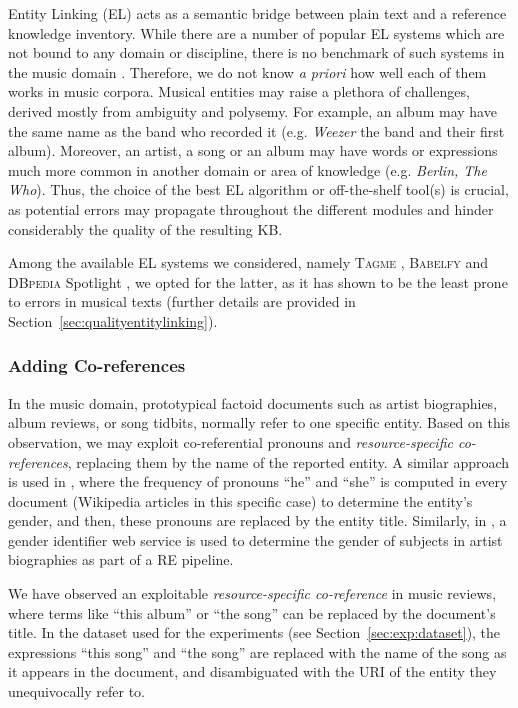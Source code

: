 Entity Linking (\textsc{EL}) acts as a semantic bridge between plain text and a reference knowledge inventory. While there are a number of popular \textsc{EL} systems which are not bound to any domain or discipline, there is no benchmark of such systems in the music domain \cite{Oramas2016}. Therefore, we do not know \textit{a priori} how well each of them works in music corpora. Musical entities may raise a plethora of challenges, derived mostly from ambiguity and polysemy. For example, an album may have the same name as the band who recorded it (e.g. \textit{Weezer} the band and their first album). Moreover, an artist, a song or an album may have words or expressions much more common in another domain or area of knowledge (e.g. \textit{Berlin, The Who}). Thus, the choice of the best \textsc{EL} algorithm or off-the-shelf tool(s) is crucial, as potential errors may propagate throughout the different modules and hinder considerably the quality of the resulting \textsc{KB}.

Among the available EL systems we considered, namely \textsc{Tagme} \cite{Ferraginaetal2010}, \textsc{Babelfy} \cite{Moroetal2014} and \textsc{DBpedia} Spotlight \cite{Mendes2011}, we opted for the latter, as it has shown to be the least prone to errors in musical texts (further details are provided in Section~\ref{sec:qualityentitylinking}).

\subsubsection{Adding Co-references}

In the music domain, prototypical factoid documents such as artist biographies, album reviews, or song tidbits, normally refer to one specific entity. Based on this observation, we may exploit co-referential pronouns and \textit{resource-specific co-references}, replacing them by the name of the reported entity.
A similar approach is used in \cite{Voskarides2015}, where the frequency of pronouns ``he'' and ``she'' is computed in every document (Wikipedia articles in this specific case) to determine the entity's gender, and then, these pronouns are replaced by the entity title. Similarly, in \cite{Oramas2014}, a gender identifier web service is used to determine the gender of subjects in artist biographies as part of a \textsc{RE} pipeline.

We have observed an exploitable \textit{resource-specific co-reference} in music reviews, where terms like ``this album'' or ``the song'' can be replaced by the document's title. In the dataset used for the experiments (see Section~\ref{sec:exp:dataset}), the expressions ``this song'' and ``the song'' are replaced with the name of the song as it appears in the document, and disambiguated with the URI of the entity they unequivocally refer to.

